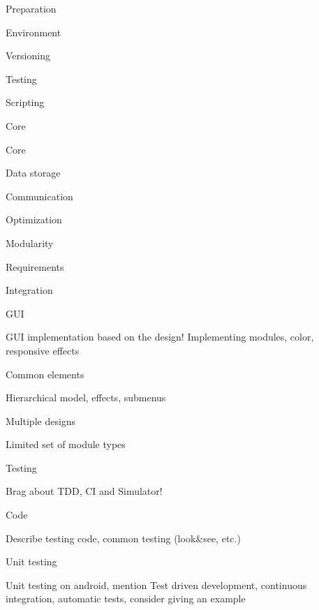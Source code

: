 \sec Preparation


\secc Environment


\secc Versioning


\secc Testing


\secc Scripting


\sec Core


\secc Core


\secc Data storage


\secc Communication


\secc Optimization


\sec Modularity


\secc Requirements


\secc Integration


\sec GUI

GUI implementation based on the design! Implementing modules, color, responsive effects

\secc Common elements

Hierarchical model, effects, submenus

\secc Multiple designs

Limited set of module types

\chap Testing

Brag about TDD, CI and Simulator!

\sec Code

Describe testing code, common testing (look\&see, etc.)

\secc Unit testing

Unit testing on android, mention Test driven development, continuous integration, automatic tests, consider giving an example

